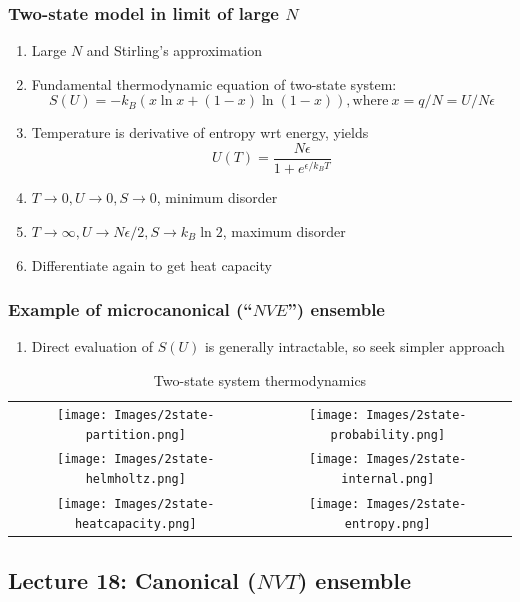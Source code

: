 \documentclass[11pt]{article}
\begin{document}
\subsubsection{Two-state model in limit of large \(N\)}
\label{sec:org97cd7af}
\begin{enumerate}
\item Large \(N\) and Stirling's approximation
\item Fundamental thermodynamic equation of two-state system:
\begin{displaymath}
  S(U)=-k_B \left ( x \ln x + (1-x) \ln (1-x) \right ), \mathrm{where}\
  x = q/N = U/N\epsilon
\end{displaymath}
\item Temperature is derivative of entropy wrt energy, yields
\begin{displaymath}
  U(T) = \frac{N\epsilon}{1+e^{\epsilon/k_BT}}
\end{displaymath}
\item \(T \rightarrow 0, U \rightarrow 0, S \rightarrow 0\), minimum disorder
\item \(T \rightarrow \infty, U \rightarrow N\epsilon/2, S \rightarrow k_B \ln 2\), maximum disorder
\item Differentiate again to get heat capacity
\end{enumerate}
\subsubsection{Example of microcanonical (``\(NVE\)'') ensemble}
\label{sec:org37bf794}
\begin{enumerate}
\item Direct evaluation of \(S(U)\) is generally intractable, so seek simpler approach
\end{enumerate}
\begin{table}
   \caption{Two-state system thermodynamics}
\begin{tabular}{cc}
\texttt{[image: Images/2state-partition.png]} & \texttt{[image: Images/2state-probability.png]} \\
\texttt{[image: Images/2state-helmholtz.png]} & \texttt{[image: Images/2state-internal.png]} \\
\texttt{[image: Images/2state-heatcapacity.png]} & \texttt{[image: Images/2state-entropy.png]}
\end{tabular}
\end{table}
\subsection{Lecture 18: Canonical (\(NVT\)) ensemble}
\label{sec:orgfe7192a}
\end{document}

